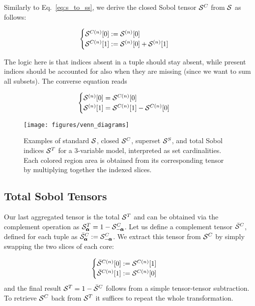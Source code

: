 \documentclass[review, twocolumn]{svjour3}          %
\begin{document}
Similarly to Eq.~\ref{eq:s_to_ss}, we derive the closed Sobol tensor $\mathcal{S}^C$ from $\mathcal{S}$ as follows:

\begin{equation}
\label{eq:s_to_sc}
\begin{cases}
\mathcal{S}^{C (n)}[0] := \mathcal{S}^{(n)}[0] \\
\mathcal{S}^{C (n)}[1] := \mathcal{S}^{(n)}[0] + \mathcal{S}^{(n)}[1]
\end{cases}
\end{equation}

The logic here is that indices absent in a tuple should stay absent, while present indices should be accounted for also when they are missing (since we want to sum all subsets). The converse equation reads

\begin{equation}
\label{eq:sc_to_s}
\begin{cases}
\mathcal{S}^{(n)}[0] = \mathcal{S}^{C (n)}[0] \\
\mathcal{S}^{(n)}[1] = \mathcal{S}^{C (n)}[1] - \mathcal{S}^{C (n)}[0]
\end{cases}
\end{equation}

\begin{figure}[t]\center
 \texttt{[image: figures/venn\_diagrams]}
 \caption{Examples of standard $\mathcal{S}$, closed $\mathcal{S}^C$, superset $\mathcal{S}^S$, and total Sobol indices $\mathcal{S}^T$ for a 3-variable model, interpreted as set cardinalities. Each colored region area is obtained from its corresponding tensor by multiplying together the indexed slices.}
  \label{fig:venn}
\end{figure}

\subsection{Total Sobol Tensors} \label{sec:total_sobol_tensor}

Our last aggregated tensor is the total $\mathcal{S}^T$ and can be obtained via the complement operation as $\mathcal{S}^T_{\pmb{\alpha}} = 1 - \mathcal{S}^C_{-\pmb{\alpha}}$. Let us define a complement tensor $\bar{\mathcal{S}}^C$, defined for each tuple as $\bar{\mathcal{S}}^C_{\pmb{\alpha}} := \mathcal{S}^C_{-\pmb{\alpha}}$. We extract this tensor from $\mathcal{S}^C$ by simply swapping the two slices of each core:

\begin{equation}
\begin{cases}
\bar{\mathcal{S}}^{C (n)}[0] := \mathcal{S}^{C (n)}[1] \\
\bar{\mathcal{S}}^{C (n)}[1] := \mathcal{S}^{C (n)}[0]
\end{cases}
\end{equation}
%
and the final result $\mathcal{S}^T = 1 - \bar{\mathcal{S}}^C$ follows from a simple tensor-tensor subtraction. To retrieve $\mathcal{S}^C$ back from $\mathcal{S}^T$ it suffices to repeat the whole transformation.
\end{document}
